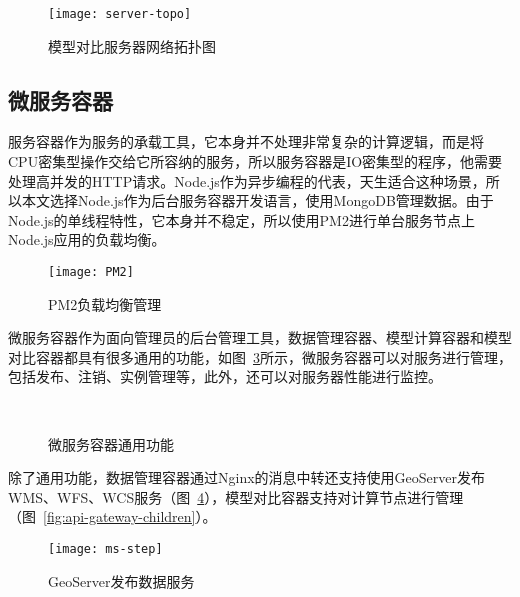 \begin{figure}[!htbp]
    \centering
    \texttt{[image: server-topo]}
    \caption{模型对比服务器网络拓扑图}
    \label{fig:server-topo}
\end{figure}

\subsection{微服务容器}
服务容器作为服务的承载工具，它本身并不处理非常复杂的计算逻辑，而是将CPU密集型操作交给它所容纳的服务，所以服务容器是IO密集型的程序，他需要处理高并发的HTTP请求。Node.js作为异步编程的代表，天生适合这种场景，所以本文选择Node.js作为后台服务容器开发语言，使用MongoDB管理数据。由于Node.js的单线程特性，它本身并不稳定，所以使用PM2进行单台服务节点上Node.js应用的负载均衡。

\begin{figure}[!htbp]
    \centering
    \texttt{[image: PM2]}
    \caption{PM2负载均衡管理}
    \label{fig:ms-LB}
\end{figure}

微服务容器作为面向管理员的后台管理工具，数据管理容器、模型计算容器和模型对比容器都具有很多通用的功能，如图~\ref{fig:service-container-common-fn}所示，微服务容器可以对服务进行管理，包括发布、注销、实例管理等，此外，还可以对服务器性能进行监控。

\begin{figure}[!htbp]
    \centering
    \hfill
     \\
    \hfill
    \caption{微服务容器通用功能}
    \label{fig:service-container-common-fn}
\end{figure}

除了通用功能，数据管理容器通过Nginx的消息中转还支持使用GeoServer发布WMS、WFS、WCS服务（图~\ref{fig:geoserver}），模型对比容器支持对计算节点进行管理（图~\ref{fig:api-gateway-children}）。

\begin{figure}[!htbp]
    \centering
    \texttt{[image: ms-step]}
    \caption{GeoServer发布数据服务}
    \label{fig:geoserver}
\end{figure}

